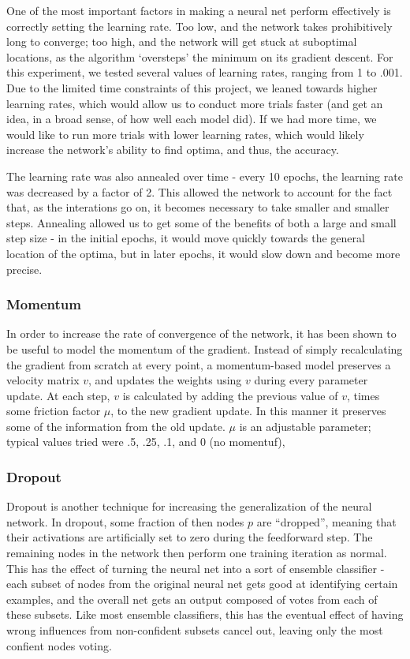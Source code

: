 \documentclass{article} %
\begin{document}
One of the most important factors in making a neural net perform effectively is correctly setting the learning rate. Too low, and the network takes prohibitively long to converge; too high, and the network will get stuck at suboptimal locations, as the algorithm `oversteps' the minimum on its gradient descent. For this experiment, we tested several values of learning rates, ranging from 1 to .001. Due to the limited time constraints of this project, we leaned towards higher learning rates, which would allow us to conduct more trials faster (and get an idea, in a broad sense, of how well each model did). If we had more time, we would like to run more trials with lower learning rates, which would likely increase the network's ability to find optima, and thus, the accuracy.

The learning rate was also annealed over time - every 10 epochs, the learning rate was decreased by a factor of 2. This allowed the network to account for the fact that, as the interations go on, it becomes necessary to take smaller and smaller steps. Annealing allowed us to get some of the benefits of both a large and small step size - in the initial epochs, it would move quickly towards the general location of the optima, but in later epochs, it would slow down and become more precise.

\subsubsection*{Momentum}

In order to increase the rate of convergence of the network, it has been shown to be useful to model the momentum of the gradient. Instead of simply recalculating the gradient from scratch at every point, a momentum-based model preserves a velocity matrix $v$, and updates the weights using $v$ during every parameter update. At each step, $v$ is calculated by adding the previous value of $v$, times some friction factor $\mu$, to the new gradient update. In this manner it preserves some of the information from the old update. $\mu$ is an adjustable parameter; typical values tried were .5, .25, .1, and 0 (no momentuf),

\subsubsection*{Dropout}

Dropout is another technique for increasing the generalization of the neural network. In dropout, some fraction of then nodes $p$ are ``dropped'', meaning that their activations are artificially set to zero during the feedforward step. The remaining nodes in the network then perform one training iteration as normal. This has the effect of turning the neural net into a sort of ensemble classifier - each subset of nodes from the original neural net gets good at identifying certain examples, and the overall net gets an output composed of votes from each of these subsets. Like most ensemble classifiers, this has the eventual effect of having wrong influences from non-confident subsets cancel out, leaving only the most confient nodes voting.
\end{document}
